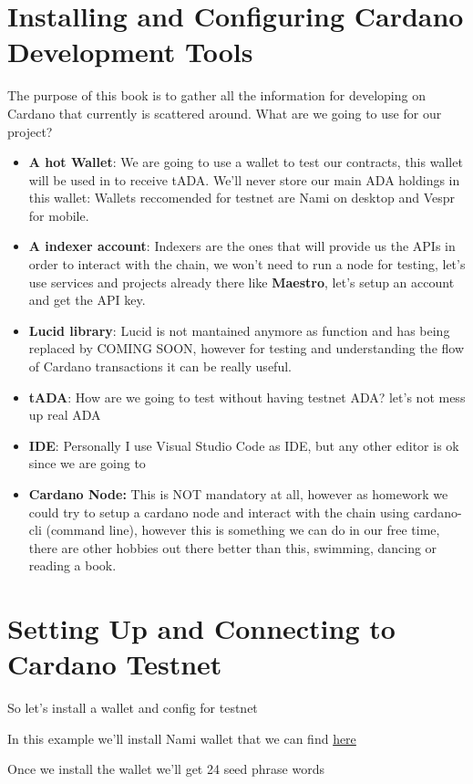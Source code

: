 \section{Installing and Configuring Cardano Development Tools}\label{sec:setup}
The purpose of this book is to gather all the information for developing on Cardano that currently is scattered around.
What are we going to use for our project?


\begin{itemize}
    \item \textbf{A hot Wallet}: We are going to use a wallet to test our contracts, this wallet will be used in to receive tADA. We'll never store our main ADA holdings in this wallet: Wallets reccomended for testnet are Nami on desktop and  Vespr for mobile.
    \item \textbf{A indexer account}: Indexers are the ones that will provide us the APIs in order to interact with the chain, we won't need to run a node for testing, let's use services and projects already there like \textbf{Maestro}, let's setup an account and get the API key.
    \item \textbf{Lucid library}: Lucid is not mantained anymore as function and has being replaced by COMING SOON, however for testing and understanding the flow of Cardano transactions it can be really useful.
    \item \textbf{tADA}: How are we going to test without having testnet ADA? let's not mess up real ADA
    \item  \textbf{IDE}: Personally I use Visual Studio Code as IDE, but any other editor is ok since we are going to 
    \item \textbf{Cardano Node:} This is NOT mandatory at all, however as homework we could try to setup a cardano node and interact with the chain using cardano-cli (command line), however this is something we can do in our free time, there are other hobbies out there better than this, swimming, dancing or reading a book.
\end{itemize}

\section{Setting Up and Connecting to Cardano Testnet}
So let's install a wallet and config for testnet 

In this example we'll install Nami wallet that we can find \href{https://www.namiwallet.io/}{here}

Once we install the wallet we'll get 24 seed phrase words

